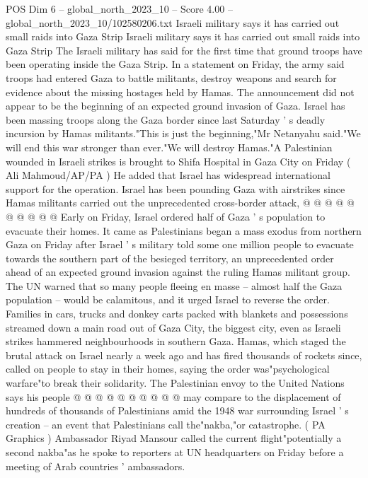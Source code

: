 \begin{textsample}{POS Dim 6 – global\_north\_2023\_10 – Score 4.00 – global\_north\_2023\_10/102580206.txt}  \label{ex:f6_pos_250}
Israeli military says it has carried out small raids into Gaza Strip Israeli military says it has carried out small raids into Gaza Strip The Israeli military has said for the first time that ground troops have been operating inside the Gaza Strip.
In a statement on Friday, the army said troops had entered Gaza to battle militants, destroy weapons and search for evidence about the missing hostages held by Hamas.
The announcement did not appear to be the beginning of an expected ground invasion of Gaza.
Israel has been massing troops along the Gaza border since last Saturday ' s deadly incursion by Hamas militants."This is just the beginning,"Mr Netanyahu said."We will end this war stronger than ever."We will destroy Hamas."A Palestinian wounded in Israeli strikes is brought to Shifa Hospital in Gaza City on Friday ( Ali Mahmoud/AP/PA ) He added that Israel has widespread international support for the operation.
Israel has been pounding Gaza with airstrikes since Hamas militants carried out the unprecedented cross-border attack, @ @ @ @ @ @ @ @ @ @ Early on Friday, Israel ordered half of Gaza ' s population to evacuate their homes.
It came as Palestinians began a mass exodus from northern Gaza on Friday after Israel ' s military told some one million people to evacuate towards the southern part of the besieged territory, an unprecedented order ahead of an expected ground invasion against the ruling Hamas militant group.
The UN warned that so many people fleeing en masse -- almost half the Gaza population -- would be calamitous, and it urged Israel to reverse the order.
Families in cars, trucks and donkey carts packed with blankets and possessions streamed down a main road out of Gaza City, the biggest city, even as Israeli strikes hammered neighbourhoods in southern Gaza.
Hamas, which staged the brutal attack on Israel nearly a week ago and has fired thousands of rockets since, called on people to stay in their homes, saying the order was"psychological warfare"to break their solidarity.
The Palestinian envoy to the United Nations says his people @ @ @ @ @ @ @ @ @ @ may compare to the displacement of hundreds of thousands of Palestinians amid the 1948 war surrounding Israel ' s creation -- an event that Palestinians call the"nakba,"or catastrophe. ( PA Graphics ) Ambassador Riyad Mansour called the current flight"potentially a second nakba"as he spoke to reporters at UN headquarters on Friday before a meeting of Arab countries ' ambassadors.

\end{textsample}
